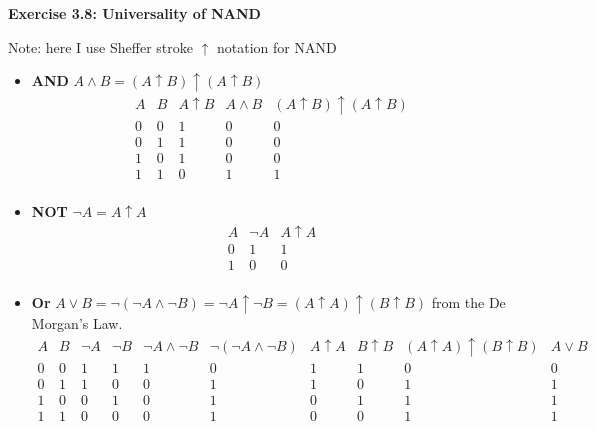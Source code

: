 \documentclass{article}
\begin{document}
\begin{framed}
    \noindent \textbf{Exercise 3.8: Universality of NAND}
    
    \medskip
    Note: here I use Sheffer stroke $\uparrow$ notation for NAND
    \begin{itemize}
        \item \textbf{AND}
        $A \land B = (A \uparrow B) \uparrow (A \uparrow B)$
        $$
        \begin{array}{c|c|c|c|c|c}
        A & B & A \uparrow B & A \land B & (A \uparrow B) \uparrow (A \uparrow B)\\
        \hline
        0 & 0 & 1 & 0 & 0\\
        0 & 1 & 1 & 0 & 0\\
        1 & 0 & 1 & 0 & 0\\
        1 & 1 & 0 & 1 & 1\\
        \end{array}
        $$
        \item \textbf{NOT} $\lnot A = A \uparrow A$
        $$
        \begin{array}{c|c|c|c|c|c}
        A & \lnot A & A \uparrow A \\
        \hline
        0 & 1 & 1\\
        1 & 0 & 0\\
        \end{array}
        $$
        \item \textbf{Or} $A \lor B = \lnot(\lnot A \land \lnot B) = \lnot A \uparrow \lnot B = (A \uparrow A) \uparrow (B \uparrow B)$ from the De Morgan's Law.
        $$
        \begin{array}{c|c|c|c|c|c|c|c|c|c}
        A & B & \lnot A & \lnot B & \lnot A \land \lnot B & \lnot(\lnot A \land \lnot B) & A \uparrow A & B \uparrow B &(A \uparrow A) \uparrow (B \uparrow B) & A \lor B \\
        \hline
        0 & 0 & 1 & 1 & 1 & 0 & 1 & 1 & 0 & 0\\
        0 & 1 & 1 & 0 & 0 & 1 & 1 & 0 & 1 & 1\\
        1 & 0 & 0 & 1 & 0 & 1 & 0 & 1 & 1 & 1\\
        1 & 1 & 0 & 0 & 0 & 1 & 0 & 0 & 1 & 1\\
        \end{array}
        $$


\end{itemize}
\end{framed}
\end{document}
